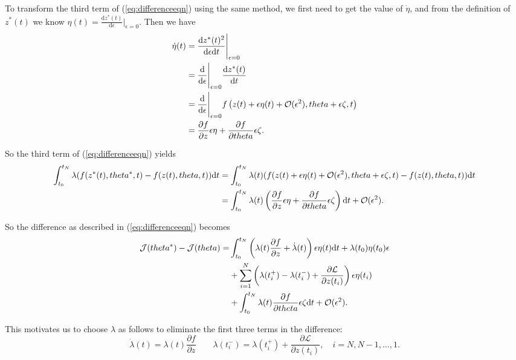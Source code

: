 \documentclass[a4paper,11pt,titlepage]{article}
\theoremstyle{definition}
\theoremstyle{plain}
\theoremstyle{remark}
\begin{document}
To transform the third term of (\ref{eq:differenceeqn}) using the same method, we first need to get the value of $\dot{\eta}$, and from the definition of $z^*(t)$ we know $\eta(t)=\frac{\mathrm{d}z^*(t)}{\mathrm{d}\epsilon}\big\rvert_{\epsilon=0}$. Then we have
\begin{align}
\dot{\eta}(t)&=\frac{\mathrm{d}z^*(t)^2}{\mathrm{d}\epsilon\mathrm{d}t}\Bigg\rvert_{\epsilon=0}\notag\\
&=\frac{\mathrm{d}}{\mathrm{d}\epsilon}\Bigg\rvert_{\epsilon=0}\frac{\mathrm{d}z^*(t)}{\mathrm{d}t}\notag\\
&=\frac{\mathrm{d}}{\mathrm{d}\epsilon}\Bigg\rvert_{\epsilon=0}f\left(z(t)+\epsilon\eta(t)+\mathcal{O}(\epsilon^2),\theta+\epsilon\zeta,t\right)\notag\\
&=\frac{\partial f}{\partial z}\epsilon\eta+\frac{\partial f}{\partial \theta}\epsilon\zeta.\notag\end{align}

So the third term of (\ref{eq:differenceeqn}) yields
\begin{align}
\int^{t_N}_{t_0}\lambda(f(z^*(t),\theta^*,t)-f(z(t),\theta,t))\mathrm{d}t&=\int^{t_N}_{t_0}\lambda(t)(f(z(t)+\epsilon\eta(t)+\mathcal{O}(\epsilon^2),\theta+\epsilon\zeta,t)-f(z(t),\theta,t))\mathrm{d}t\notag\\
&=\int^{t_N}_{t_0}\lambda(t)\left(\frac{\partial f}{\partial z}\epsilon\eta+\frac{\partial f}{\partial \theta}\epsilon\zeta\right)\mathrm{d}t+\mathcal{O}(\epsilon^2).\notag
\end{align}

So the difference as described in (\ref{eq:differenceeqn}) becomes
\begin{align}
\mathcal{J}(\theta^*)-\mathcal{J}(\theta)=&\int^{t_N}_{t_0}\left(\lambda(t)\frac{\partial f}{\partial z}+\dot{\lambda}(t)\right)\epsilon\eta(t)\mathrm{d}t+\lambda(t_0)\eta(t_0)\epsilon\notag\\
&+\sum^{N}_{i=1} \left(\lambda(t_i^+)-\lambda(t_i^-)+\frac{\partial \mathcal{L}}{\partial z(t_i)}\right)\epsilon\eta(t_i)\notag\\
&+\int^{t_N}_{t_0}\lambda(t)\frac{\partial f}{\partial \theta}\epsilon\zeta\mathrm{d}t+\mathcal{O}(\epsilon^2).
\label{eq6}
\end{align}

This motivates us to choose $\lambda$ as follows to eliminate the first three terms in the difference:
$$
\dot{\lambda}(t)=\lambda(t)\frac{\partial f}{\partial z}\quad\quad \lambda(t_i^-)=\lambda(t_i^+)+\frac{\partial\mathcal{L}}{\partial z(t_i)}, \quad i=N,N-1,\dots,1.
$$
\end{document}
